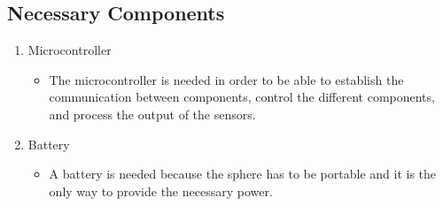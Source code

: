\subsection{Necessary Components}
\begin{enumerate}
\item Microcontroller
	\begin{itemize}
		\item The microcontroller is needed in order to be able to establish the communication between components, control the different components, and process the output of the sensors.
	\end{itemize}

\item Battery
	\begin{itemize}
		\item A battery is needed because the sphere has to be portable and it is the only way to provide the necessary power.
	\end{itemize}


\end{enumerate}
